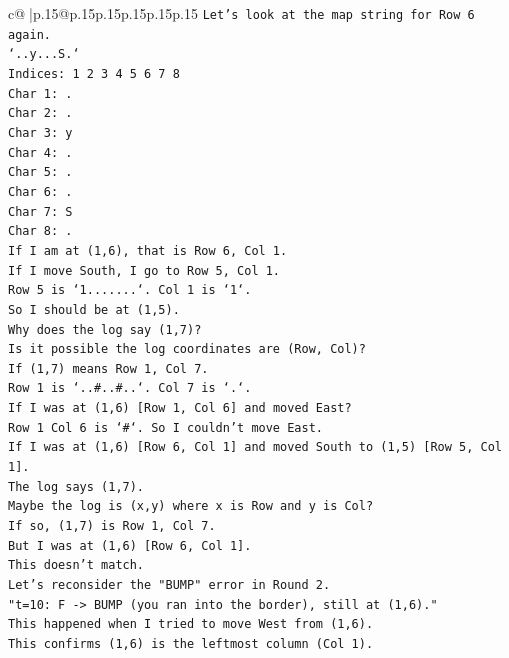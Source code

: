 \documentclass{article}
\begin{document}
{\begin{supertabular}{c@{$\;$}|p{.15\linewidth}@{}p{.15\linewidth}p{.15\linewidth}p{.15\linewidth}p{.15\linewidth}p{.15\linewidth}}
{{{\texttt{Let's look at the map string for Row 6 again.} \\
\texttt{`..y...S.`} \\
\texttt{Indices: 1 2 3 4 5 6 7 8} \\
\texttt{Char 1: .} \\
\texttt{Char 2: .} \\
\texttt{Char 3: y} \\
\texttt{Char 4: .} \\
\texttt{Char 5: .} \\
\texttt{Char 6: .} \\
\texttt{Char 7: S} \\
\texttt{Char 8: .} \\
\texttt{If I am at (1,6), that is Row 6, Col 1.} \\
\texttt{If I move South, I go to Row 5, Col 1.} \\
\texttt{Row 5 is `1.......`. Col 1 is `1`.} \\
\texttt{So I should be at (1,5).} \\
\texttt{Why does the log say (1,7)?} \\
\texttt{Is it possible the log coordinates are (Row, Col)?} \\
\texttt{If (1,7) means Row 1, Col 7.} \\
\texttt{Row 1 is `..\#..\#..`. Col 7 is `.`.} \\
\texttt{If I was at (1,6) {[}Row 1, Col 6{]} and moved East?} \\
\texttt{Row 1 Col 6 is `\#`. So I couldn't move East.} \\
\texttt{If I was at (1,6) {[}Row 6, Col 1{]} and moved South to (1,5) {[}Row 5, Col 1{]}.} \\
\texttt{The log says (1,7).} \\
\texttt{Maybe the log is (x,y) where x is Row and y is Col?} \\
\texttt{If so, (1,7) is Row 1, Col 7.} \\
\texttt{But I was at (1,6) {[}Row 6, Col 1{]}.} \\
\texttt{This doesn't match.} \\
\texttt{Let's reconsider the "BUMP" error in Round 2.} \\
\texttt{"t=10: F {-}> BUMP (you ran into the border), still at (1,6)."} \\
\texttt{This happened when I tried to move West from (1,6).} \\
\texttt{This confirms (1,6) is the leftmost column (Col 1).} \\
}}}
\end{supertabular}}
\end{document}
